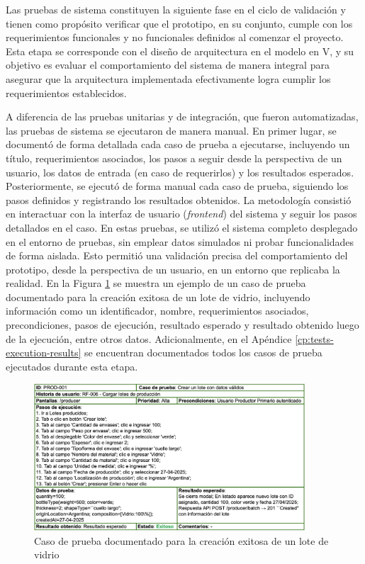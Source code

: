Las pruebas de sistema constituyen la siguiente fase en el ciclo de validación y tienen como propósito verificar que el prototipo, en su conjunto, cumple con los requerimientos funcionales y no funcionales definidos al comenzar el proyecto. Esta etapa se corresponde con el diseño de arquitectura en el modelo en V, y su objetivo es evaluar el comportamiento del sistema de manera integral para asegurar que la arquitectura implementada efectivamente logra cumplir los requerimientos establecidos.

A diferencia de las pruebas unitarias y de integración, que fueron automatizadas, las pruebas de sistema se ejecutaron de manera manual. En primer lugar, se documentó de forma detallada cada caso de prueba a ejecutarse, incluyendo un título, requerimientos asociados, los pasos a seguir desde la perspectiva de un usuario, los datos de entrada (en caso de requerirlos) y los resultados esperados. Posteriormente, se ejecutó de forma manual cada caso de prueba, siguiendo los pasos definidos y registrando los resultados obtenidos. La metodología consistió en interactuar con la interfaz de usuario (\textit{frontend}) del sistema y seguir los pasos detallados en el caso. En estas pruebas, se utilizó el sistema completo desplegado en el entorno de pruebas, sin emplear datos simulados ni probar funcionalidades de forma aislada. Esto permitió una validación precisa del comportamiento del prototipo, desde la perspectiva de un usuario, en un entorno que replicaba la realidad. En la Figura \ref{fig:system-test-case-example} se muestra un ejemplo de un caso de prueba documentado para la creación exitosa de un lote de vidrio, incluyendo información como un identificador, nombre, requerimientos asociados, precondiciones, pasos de ejecución, resultado esperado y resultado obtenido luego de la ejecución, entre otros datos. Adicionalmente, en el Apéndice \ref{cp:tests-execution-results} se encuentran documentados todos los casos de prueba ejecutados durante esta etapa.

\begin{figure}[!b]
	\centering
	\includegraphics[width=0.9\textwidth]{Figures/system-test-case-example.png}
	\caption{Caso de prueba documentado para la creación exitosa de un lote de vidrio}
	\label{fig:system-test-case-example}
\end{figure}

